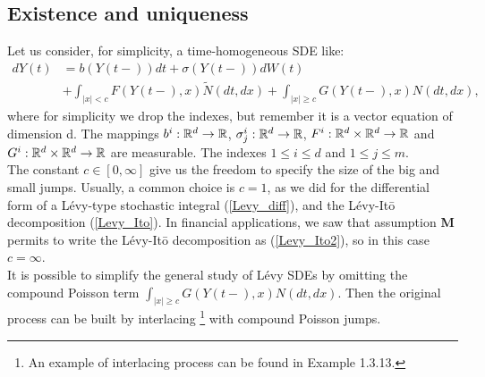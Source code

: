 \subsection{Existence and uniqueness}\label{existence_uniqueness}

Let us consider, for simplicity, a time-homogeneous SDE like:
\begin{align} \label{SDE}
 dY(t) &= b(Y(t-)) dt  + \sigma(Y(t-)) dW(t)\\ \nonumber
     &+ \int_{|x|<c} F(Y(t-),x) \tilde N (dt,dx) + \int_{|x|\geq c} G(Y(t-),x) N(dt,dx),
\end{align}
where for simplicity we drop the indexes, but remember it is a vector equation of dimension d. 
The mappings $b^i:\mathbb{R}^d \to \mathbb{R}$, $\sigma^i_j:\mathbb{R}^d \to \mathbb{R}$, $F^i:\mathbb{R}^d\times \mathbb{R}^d \to \mathbb{R}$ and $G^i:\mathbb{R}^d\times \mathbb{R}^d \to \mathbb{R}$ 
are measurable. The indexes $1 \leq i \leq d$ and $1 \leq j \leq m$. \\
The constant $c \in [0,\infty]$ give us the freedom to specify the size of the big and small jumps.
Usually, a common choice is $c=1$, as we did for the differential form of a Lévy-type stochastic integral (\ref{Levy_diff}), and 
the Lévy-It\={o} decomposition (\ref{Levy_Ito}).
In financial applications, we saw that assumption \textbf{M} permits to write the Lévy-It\={o} decomposition as 
(\ref{Levy_Ito2}), so in this case $c=\infty$.\\
It is possible to simplify the general study of Lévy SDEs by omitting the compound Poisson term 
$\int_{|x|\geq c} G(Y(t-),x) N(dt,dx)$. Then the original process can be built by interlacing \footnote{An example of interlacing
process can be found in \cite{Applebaum} Example 1.3.13.} with compound Poisson jumps.\\   


